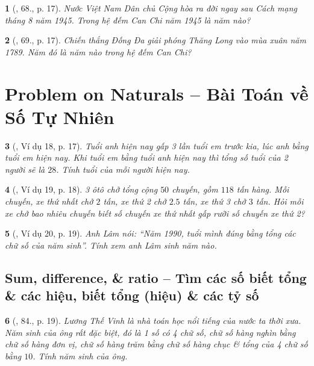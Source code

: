 \documentclass{article}
\newtheorem{baitoan}{}
\begin{document}
\begin{baitoan}[\cite{Tuyen_Toan_6}, 68., p. 17]
	Nước Việt Nam Dân chủ Cộng hòa ra đời ngay sau Cách mạng tháng 8 năm 1945. Trong hệ đếm Can Chi năm 1945 là năm nào?
\end{baitoan}

\begin{baitoan}[\cite{Tuyen_Toan_6}, 69., p. 17]
	Chiến thắng Đống Đa giải phóng Thăng Long vào mùa xuân năm 1789. Năm đó là năm nào trong hệ đếm Can Chi?
\end{baitoan}


\section{Problem on Naturals -- Bài Toán về Số Tự Nhiên}

\begin{baitoan}[\cite{Binh_Toan_6_tap_1}, Ví dụ 18, p. 17]
	Tuổi anh hiện nay gấp 3 lần tuổi em trước kia, lúc anh bằng tuổi em hiện nay. Khi tuổi em bằng tuổi anh hiện nay thì tổng số tuổi của 2 người sẽ là $28$. Tính tuổi của mỗi người hiện nay.
\end{baitoan}

\begin{baitoan}[\cite{Binh_Toan_6_tap_1}, Ví dụ 19, p. 18]
	3 ôtô chở tổng cộng $50$ chuyến, gồm $118$ tấn hàng. Mỗi chuyến, xe thứ nhất chở $2$ tấn, xe thứ 2 chở $2.5$ tấn, xe thứ 3 chở $3$ tấn. Hỏi mỗi xe chở bao nhiêu chuyến biết số chuyến xe thứ nhất gấp rưỡi số chuyến xe thứ 2?
\end{baitoan}

\begin{baitoan}[\cite{Binh_Toan_6_tap_1}, Ví dụ 20, p. 19]
	Anh Lâm nói: ``Năm 1990, tuổi mình đúng bằng tổng các chữ số của năm sinh''. Tính xem anh Lâm sinh năm nào.
\end{baitoan}

\subsection{Sum, difference, \& ratio -- Tìm các số biết tổng \& các hiệu, biết tổng (hiệu) \& các tỷ số}

\begin{baitoan}[\cite{Binh_Toan_6_tap_1}, 84., p. 19]
	Lương Thế Vinh là nhà toán học nổi tiếng của nước ta thời xưa. Năm sinh của ông rất đặc biệt, đó là 1 số có 4 chữ số, chữ số hàng nghìn bằng chữ số hàng đơn vị, chữ số hàng trăm bằng chữ số hàng chục \& tổng của 4 chữ số bằng $10$. Tính năm sinh của ông.
\end{baitoan}
\end{document}
